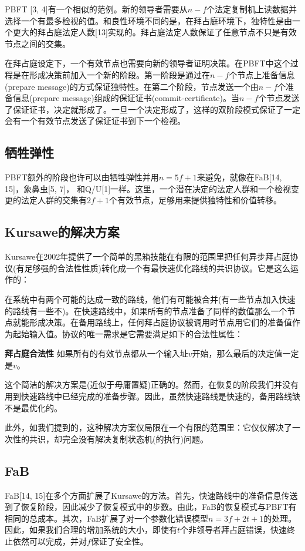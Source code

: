 \documentclass[UTF8]{ctexart}
\begin{document}
PBFT [3, 4]有一个相似的范例。新的领导者需要从$n - f$个法定复制机上读数据并选择一个有最多检视的值。和良性环境不同的是，在拜占庭环境下，独特性是由一个更大的拜占庭法定人数[13]实现的。拜占庭法定人数保证了任意节点不只是有效节点之间的交集。

在拜占庭设定下，一个有效节点也需要向新的领导者证明决策。在PBFT中这个过程是在形成决策前加入一个新的阶段。第一阶段是通过在$n - f$个节点上准备信息(prepare message)的方式保证独特性。在第二个阶段，节点发送一个由$n - f$个准备信息(prepare message)组成的保证证书(commit-certificate)。当$n - f$个节点发送了保证证书，决定就形成了。一旦一个决定形成了，这样的双阶段模式保证了一定会有一个有效节点发送了保证证书到下一个检视。

\subsection*{牺牲弹性}
PBFT额外的阶段也许可以由牺牲弹性并用$n = 5f + 1$来避免，就像在FaB[14, 15]，象鼻虫[5, 7]， 和Q/U[1]一样。这里，一个潜在决定的法定人群和一个检视变更的法定人群的交集有$2f + 1$个有效节点，足够用来提供独特性和价值转移。

\subsection*{Kursawe的解决方案}
Kursawe在2002年提供了一个简单的黑箱技能在有限的范围里把任何异步拜占庭协议(有足够强的合法性性质)转化成一个有最快速优化路线的共识协议。它是这么运作的：

在系统中有两个可能的达成一致的路线，他们有可能被合并(有一些节点加入快速的路线有一些不)。在快速路线中，如果所有的节点准备了同样的数值那么一个节点就能形成决策。在备用路线上，任何拜占庭协议被调用时节点用它们的准备值作为起始输入值。协议的唯一需求是它需要满足如下的合法性属性：

\textbf{拜占庭合法性} \hspace{3mm} 如果所有的有效节点都从一个输入址$v$开始，那么最后的决定值一定是$v$。

这个简洁的解决方案是(近似于毋庸置疑)正确的。然而，在恢复的阶段我们并没有用到快速路线中已经完成的准备步骤。因此，虽然快速路线是快速的，备用路线缺不是最优化的。

此外，如我们提到的，这种解决方案仅局限在一个有限的范围里：它仅仅解决了一次性的共识，却完全没有解决复制状态机(的执行)问题。

\subsection*{FaB}
FaB[14, 15]在多个方面扩展了Kursawe的方法。首先，快速路线中的准备信息传送到了恢复阶段，因此减少了恢复模式中的步数。由此，FaB的恢复模式与PBFT有相同的总成本。其次，FaB扩展了对一个参数化错误模型$n = 3f + 2t + 1$的处理。因此，如果我们合理的增加系统的大小，即使有$t$个非领导者拜占庭错误，快速终止依然可以完成，并对$f$保证了安全性。
\end{document}
